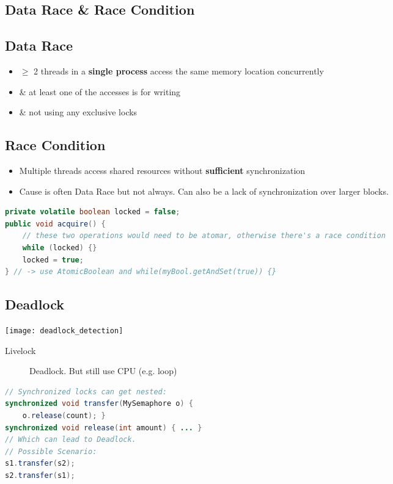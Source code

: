 \begin{multicols*}{4}
\section{Data Race \& Race Condition}
    \subsection{Data Race}
    \begin{itemize}
        \item $\geq$ 2 threads in a \textbf{single process} access the same memory location concurrently
        \item \& at least one of the accesses is for writing
        \item \& not using any exclusive locks
    \end{itemize}

    \subsection{Race Condition}
    \begin{itemize}
        \item Multiple threads access shared resources without \textbf{sufficient} synchronization
        \item Cause is often Data Race but not always. Can also be a lack of synchronization over larger blocks.
    \end{itemize}

	\begin{lstlisting}[language=java]
private volatile boolean locked = false;
public void acquire() {
	// these two operations would need to be atomar, otherwise there's a race condition
	while (locked) {}
	locked = true;
} // -> use AtomicBoolean and while(myBool.getAndSet(true)) {}
\end{lstlisting}

    \subsection{Deadlock}
    \texttt{[image: deadlock\_detection]}
    \begin{description}
        \item[Livelock] Deadlock. But still use CPU (e.g.  loop)
    \end{description}

    \begin{lstlisting}[language=java]
// Synchronized locks can get nested:
synchronized void transfer(MySemaphore o) {
    o.release(count); }
synchronized void release(int amount) { ... }
// Which can lead to Deadlock.
// Possible Scenario:
s1.transfer(s2);
s2.transfer(s1);
\end{lstlisting}

\end{multicols*}

